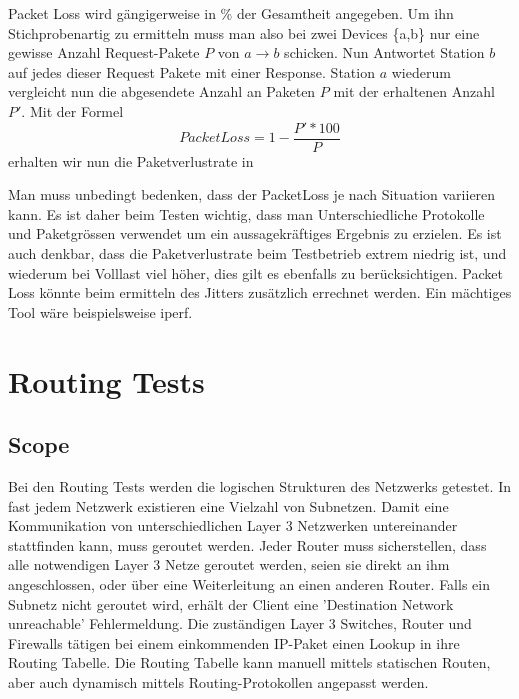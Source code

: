 \documentclass[a4,12pt]{scrartcl}
\begin{document}
\noindent Packet Loss wird gängigerweise in \% der Gesamtheit angegeben. Um ihn Stichprobenartig zu ermitteln muss man also bei zwei Devices \{a,b\} nur eine gewisse Anzahl Request-Pakete $P$ von $a \rightarrow b$ schicken. Nun Antwortet Station $b$ auf jedes dieser Request Pakete mit einer Response. Station $a$ wiederum vergleicht nun die abgesendete Anzahl an Paketen $P$ mit der erhaltenen Anzahl $P'$. 
Mit der Formel
\begin{equation}
Packet Loss = 1-\frac{P' * 100}{P}
\end{equation}
erhalten wir nun die Paketverlustrate in %

\noindent Man muss unbedingt bedenken, dass der PacketLoss je nach Situation variieren kann. Es ist daher beim Testen wichtig, dass man Unterschiedliche Protokolle und Paketgrössen verwendet um ein aussagekräftiges Ergebnis zu erzielen. Es ist auch denkbar, dass die Paketverlustrate beim Testbetrieb extrem niedrig ist, und wiederum bei Volllast viel höher, dies gilt es ebenfalls zu berücksichtigen. Packet Loss könnte beim ermitteln des Jitters zusätzlich errechnet werden. Ein mächtiges Tool wäre beispielsweise iperf.
\newpage
\section{Routing Tests}
\subsection{Scope}
Bei den Routing Tests werden die logischen Strukturen des Netzwerks getestet. In fast jedem Netzwerk existieren eine Vielzahl von Subnetzen. Damit eine Kommunikation von unterschiedlichen Layer 3 Netzwerken untereinander stattfinden kann, muss geroutet werden. Jeder Router muss sicherstellen, dass alle notwendigen Layer 3 Netze geroutet werden, seien sie direkt an ihm angeschlossen, oder über eine Weiterleitung an einen anderen Router. Falls ein Subnetz nicht geroutet wird, erhält der Client eine 'Destination Network unreachable' Fehlermeldung. Die zuständigen Layer 3 Switches, Router und Firewalls tätigen bei einem einkommenden IP-Paket einen Lookup in ihre Routing Tabelle. Die Routing Tabelle kann manuell mittels statischen Routen, aber auch dynamisch mittels Routing-Protokollen angepasst werden.\\
\end{document}

